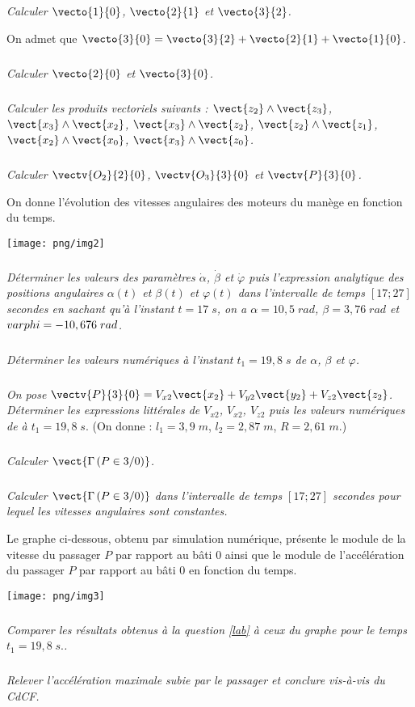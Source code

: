 \documentclass[10pt,oneside]{article}
\begin{document}
\subparagraph{}
\textit{Calculer $\vecto{1}{0}$, $\vecto{2}{1}$ et $\vecto{3}{2}$.}

\vspace{.3cm}

On admet que $\vecto{3}{0}=\vecto{3}{2}+\vecto{2}{1}+\vecto{1}{0}$.

\subparagraph{}
\textit{Calculer $\vecto{2}{0}$ et $\vecto{3}{0}$.}

\subparagraph{}
\textit{Calculer les produits vectoriels suivants : $\vect{z_2}\wedge\vect{z_3}$,
$\vect{x_3}\wedge\vect{x_2}$, $\vect{x_3}\wedge\vect{z_2}$,
$\vect{z_2}\wedge\vect{z_1}$, $\vect{x_2}\wedge\vect{x_0}$,
$\vect{x_3}\wedge\vect{z_0}$.}


\subparagraph{}
\textit{Calculer $\vectv{O_2}{2}{0}$, $\vectv{O_3}{3}{0}$ et $\vectv{P}{3}{0}$.}

\vspace{.3cm}

On donne l'évolution des vitesses angulaires des moteurs du manège en fonction du temps.
\begin{center}
\texttt{[image: png/img2]}
\end{center}

\subparagraph{\label{lab}}
\textit{Déterminer les valeurs des paramètres $\dot{\alpha}$, $\dot{\beta}$ et $\dot{\varphi}$
puis l'expression analytique des positions angulaires $\alpha(t)$ et $\beta(t)$ et $\varphi(t)$ dans l'intervalle de temps $[17;27]$ secondes en sachant qu'à l'instant $t=17\;s$, on a $\alpha=10,5\; rad$, $\beta=3,76\; rad$ et $\\varphi=-10,676\; rad$.}

\subparagraph{}
\textit{Déterminer les valeurs numériques à l'instant $t_1=19,8\; s$ de $\alpha$, $\beta$ et $\varphi$.}

\subparagraph{}
\textit{On pose $\vectv{P}{3}{0}=V_{x2}\vect{x_2}+V_{y2}\vect{y_2}+V_{z2}\vect{z_2}$. Déterminer les expressions littérales de $V_{x2}$, $V_{x2}$, $V_{z2}$ puis les valeurs numériques de à $t_1=19,8\;s.$} (On donne : $l_1=3,9\;m$, $l_2=2,87\;m$, $R=2,61\;m$.)

\subparagraph{}
\textit{Calculer $\vect{\Gamma\left(P\in3/0 \right)}$.}

\subparagraph{}
\textit{Calculer $\vect{\Gamma\left(P\in3/0 \right)}$ dans l'intervalle de temps $[17;27]$ secondes pour lequel les vitesses angulaires sont constantes.}

\vspace{.3cm}

Le graphe ci-dessous, obtenu par simulation numérique, présente le module de la vitesse du passager $P$ par rapport au bâti 0 ainsi que le module de l'accélération du passager $P$ par rapport au bâti 0 en fonction du temps. 
\begin{center}
\texttt{[image: png/img3]}
\end{center}

\subparagraph{}
\textit{Comparer les résultats obtenus à la question \ref{lab} à ceux du graphe pour le temps $t_1=19,8\;s.$.}

\subparagraph{}
\textit{Relever l'accélération maximale subie par le passager et conclure vis-à-vis du CdCF.}
\end{document}
